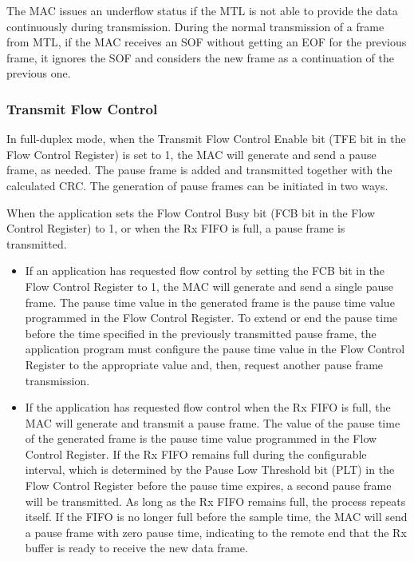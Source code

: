 \documentclass[main\_\_EN.tex]{subfiles}
\begin{document}
The MAC issues an underflow status if the MTL is not able to provide the data continuously during transmission. During the normal transmission of a frame from MTL, if the MAC receives an SOF without getting an EOF for the previous frame, it ignores the SOF and considers the new frame as a continuation of the previous one.

\subsubsection{Transmit Flow Control}
In full-duplex mode, when the Transmit Flow Control Enable bit (TFE bit in the Flow Control Register) is set to 1, the MAC will generate and send a pause frame, as needed. The pause frame is added and transmitted together with the calculated CRC. The generation of pause frames can be initiated in two ways.

When the application sets the Flow Control Busy bit (FCB bit in the Flow Control Register) to 1, or when the Rx FIFO is full, a pause frame is transmitted.

\begin{itemize}
    \item If an application has requested flow control by setting the FCB bit in the Flow Control Register to 1, the MAC will generate and send a single pause frame. The pause time value in the generated frame is the pause time value programmed in the Flow Control Register. To extend or end the pause time before the time specified in the previously transmitted pause frame, the application program must configure the pause time value in the Flow Control Register to the appropriate value and, then, request another pause frame transmission.
    \item If the application has requested flow control when the Rx FIFO is full, the MAC will generate and transmit a pause frame. The value of the pause time of the generated frame is the pause time value programmed in the Flow Control Register. If the Rx FIFO remains full during the configurable interval, which is determined by the Pause Low Threshold bit (PLT) in the Flow Control Register before the pause time expires, a second pause frame will be transmitted. As long as the Rx FIFO remains full, the process repeats itself. If the FIFO is no longer full before the sample time, the MAC will send a pause frame with zero pause time, indicating to the remote end that the Rx buffer is ready to receive the new data frame.
\end{itemize}
\end{document}
